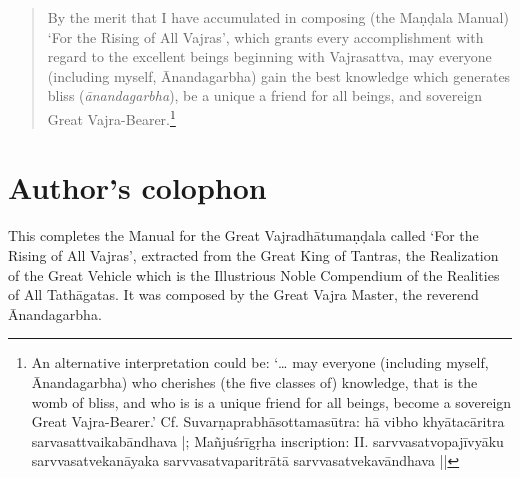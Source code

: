\documentclass[11pt]{book}
\newcommand{\skt}[1]{\emph{#1}}
\begin{document}
\begin{verse}
By the merit that I have accumulated in composing (the Maṇḍala Manual) `For the Rising of All Vajras', which grants every accomplishment with regard to the excellent beings beginning with Vajrasattva, may everyone (including myself, Ānandagarbha) gain the best knowledge which generates bliss (\skt{ānandagarbha}), be a unique a friend for all beings, and sovereign Great Vajra-Bearer.\footnote{An alternative interpretation could be: `… may everyone (including myself, Ānandagarbha) who cherishes (the five classes of) knowledge, that is the womb of bliss, and who is is a unique friend for all beings, become a sovereign Great Vajra-Bearer.’ Cf. Suvarṇaprabhāsottamasūtra: hā vibho khyātacāritra sarvasattvaikabāndhava |; Mañjuśrīgṛha inscription: II.	sarvvasatvopajīvyāku sarvvasatvekanāyaka sarvvasatvaparitrātā sarvvasatvekavāndhava ||}
\end{verse}

\section{Author's colophon}
This completes the Manual for the Great Vajradhātumaṇḍala called `For the Rising of All Vajras', extracted from the Great King of Tantras, the Realization of the Great Vehicle which is the Illustrious Noble Compendium of the Realities of All Tathāgatas. It was composed by the Great Vajra Master, the reverend Ānandagarbha.
\end{document}

